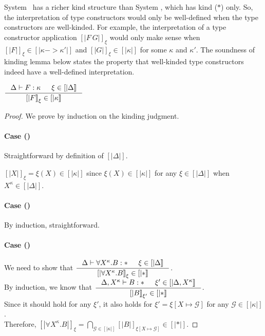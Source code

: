 System \Fw\ has a richer kind structure than System \F, which has kind ($*$)
only. So, the interpretation of type constructors would only be well-defined
when the type constructors are well-kinded. For example, the interpretation of
a type constructor application $[|F~G|]_\xi$ would only make sense
when $[|F|]_\xi\in[|\kappa -> \kappa'|]$ and
$[|G|]_\xi\in[|\kappa|]$ for some $\kappa$ and $\kappa'$.
The soundness of kinding lemma below states the property that
well-kinded type constructors indeed have a well-defined interpretation.
\begin{lemma}  \label{lem:fw:soundki}
$ \inference{\Delta |- F : \kappa & \xi\in[|\Delta|]}{[|F|]_\xi\in[|\kappa|]} $
\end{lemma}
\begin{proof}
We prove by induction on the kinding judgment.
\paragraph{Case ()}
Straightforward by definition of $[|\Delta|]$.

$[|X|]_\xi=\xi(X) \in [|\kappa|]$
since $\xi(X)\in[|\kappa|]$ for any $\xi\in[|\Delta|]$
when $X^\kappa \in [|\Delta|]$.

\paragraph{Case ()} By induction, straightforward.

\paragraph{Case ()}
We need to show that
$ \inference{\Delta |- \forall X^\kappa.B:* & \xi\in[|\Delta|]}
        {[|\forall X^\kappa.B|]_\xi\in[|*|]} $.
\vspace*{.3em} \\
By induction, we know that
$ \inference{\Delta,X^\kappa |- B:* & \xi'\in[|\Delta,X^\kappa|]}
        {[|B|]_{\xi'} \in [|*|]} $.
\vspace*{.3em} \\
Since it should hold for any $\xi'$, it also holds for
$\xi'=\xi[X\mapsto\mathcal{G}]$ for any $\mathcal{G}\in[|\kappa|]$.
\vspace*{.3em} \\
Therefore,
$  [|\forall X^\kappa.B|]_\xi
 = \bigcap_{\mathcal{G}\in[|\kappa|]}[|B|]_{\xi[X\mapsto\mathcal{G}]}\in[|*|] $.


\end{proof}

